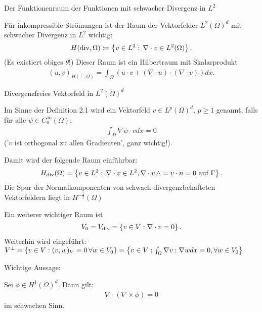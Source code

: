 \begin{bemerkung}
  Der Funktionenraum der Funktionen mit schwacher Divergenz in $L^{2}$

Für inkompressible Strömungen ist der Raum der Vektorfelder $L^{2}(\Omega)^{d}$ mit schwacher Divergenz in $L^{2}$ wichtig:
\begin{align*}
  H(\operatorname{div},\Omega) \coloneqq \left\{ v \in L^{2}: \, \nabla \cdot v \in L^{2}(\Omega) \right\}. 
\end{align*}
(Es existiert obiges $\theta$!) Dieser Raum ist ein Hilbertraum mit Skalarprodukt
\begin{align*}
  (u, v)_{H(\div, \Omega)} = \int_{\Omega}(u\cdot v + (\nabla \cdot u)\cdot(\nabla\cdot v)) dx.
\end{align*}
\end{bemerkung}
\begin{definition}
  Divergenzfreies Vektorfeld in $L^{2}(\Omega)^{d}$

Im Sinne der Definition 2.1 wird ein Vektorfeld $v \in L^{p}(\Omega)^{d}$, $p\geq 1$  genannt, falls für alle $\psi \in C_{0}^{\infty}(\Omega)$: 
\begin{align*}
  \int_{\Omega}\nabla\psi \cdot v dx = 0
\end{align*}
('$v$ ist orthogonal zu allen Gradienten', ganz wichtig!).

Damit wird der folgende Raum einführbar:
\begin{align*}
  H_{\operatorname{div}}(\Omega) = \left\{ v \in L^{2}: \, \nabla \cdot v \in L^{2}, \nabla\cdot v \,\wedge = v \cdot n = 0 \text{ auf }\Gamma \right\}. 
\end{align*}
Die Spur der Normalkomponenten von schwach divergenzbehafteten Vektorfeldern liegt in $H^{- \frac{1}{2}}(\Omega)$

Ein weiterer wichtiger Raum ist
\begin{align*}
  V_{0} = V_{\operatorname{div}} = \left\{ v \in V: \nabla \cdot v = 0 \right\}.
\end{align*}
Weiterhin wird eingeführt: $V^{\perp} = \left\{ v \in V: (v, w)_{V} = 0\, \forall w \in V_{0} \right\} = \left\{ v \in V: \int_{\Omega} \nabla v: \nabla w dx = 0, \forall w \in V_{0} \right\}$
\end{definition}
\begin{lemma}Wichtige Aussage:

  Sei $\phi \in H^{1}(\Omega)^{d}$. Dann gilt:
  \begin{align*}
    \nabla \cdot (\nabla \times \phi) = 0
  \end{align*}
im schwachen Sinn.
\end{lemma}

